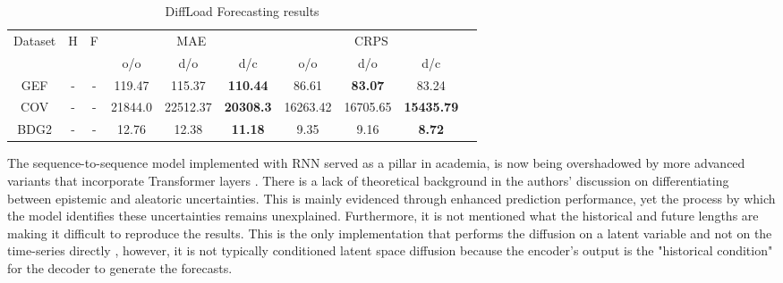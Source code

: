 \begin{table}[ht]
    \centering
    \begin{tabular}{cccccccccc}
        \toprule
        \multirow{2}{*}{Dataset} & \multirow{2}{*}{H} & \multirow{2}{*}{F} & \multicolumn{3}{c}{MAE} & \multicolumn{3}{c}{CRPS} \\
        \cmidrule(lr){4-6} \cmidrule(lr){7-9}
         & & & o/o & d/o & d/c & o/o & d/o & d/c \\
        \midrule
        GEF & - & - & 119.47 & 115.37 & \textbf{110.44} & 86.61 & \textbf{83.07} & 83.24 \\
        \midrule
        COV & - & - & 21844.0 & 22512.37 & \textbf{20308.3} & 16263.42 & 16705.65 & \textbf{15435.79} \\
        \midrule
        BDG2 & - & - & 12.76 & 12.38 & \textbf{11.18} & 9.35 & 9.16 & \textbf{8.72} \\
        \bottomrule
    \end{tabular}
    \caption{DiffLoad Forecasting results \cite{wang_diffload_2023}}
    \label{tab:diffload-results}
\end{table}

The sequence-to-sequence model implemented with RNN served as a pillar in academia, is now being overshadowed by more advanced variants that incorporate Transformer layers \cite{nie_time_2023}.
There is a lack of theoretical background in the authors' discussion on differentiating between epistemic and aleatoric uncertainties. This is mainly evidenced through enhanced prediction performance, yet the process by which the model identifies these uncertainties remains unexplained.
Furthermore, it is not mentioned what the historical and future lengths are making it difficult to reproduce the results. 
This is the only implementation that performs the diffusion on a latent variable and not on the time-series directly \cite{rombach_high-resolution_2022}, however, it is not typically conditioned latent space diffusion because the encoder's output is the "historical condition" for the decoder to generate the forecasts.